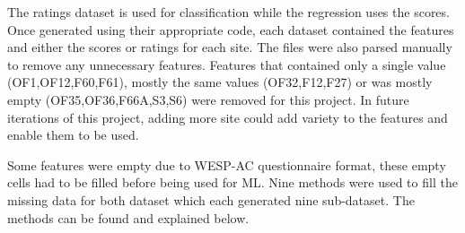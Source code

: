 \documentclass[12pt,letterpaper]{article}
\begin{document}
The ratings dataset is used for classification while the regression uses the scores.
Once generated using their appropriate code, each dataset contained the features and either the scores or ratings for each site.
The files were also parsed manually to remove any unnecessary features.
Features that contained only a single value (OF1,OF12,F60,F61), mostly the same values (OF32,F12,F27) or was mostly empty (OF35,OF36,F66A,S3,S6) were removed for this project.
In future iterations of this project, adding more site could add variety to the features and enable them to be used.

Some features were empty due to WESP-AC questionnaire format, these empty cells had to be filled before being used for \ac{ML}.
Nine methods were used to fill the missing data for both dataset which each generated nine sub-dataset.
The methods can be found and explained below.
\end{document}
